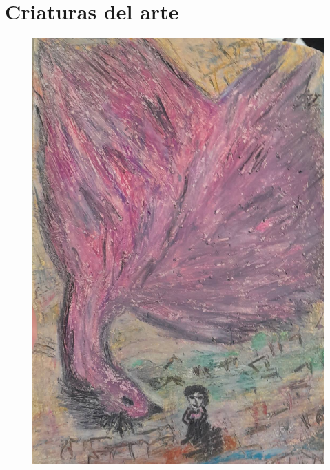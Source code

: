 \documentclass[12pt, a4paper, twoside]{book} %
\begin{document}
\chapter{Criaturas del arte}

\begin{figure}[H]
	\centering
	\includegraphics[scale=0.3]{./images/1f81324dd8eef5.jpg}
\end{figure}
\end{document}
